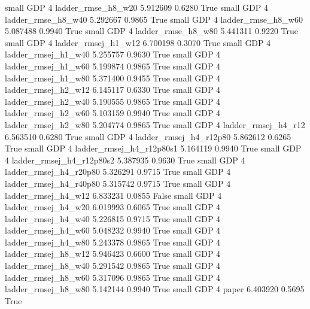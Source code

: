      small      GDP                 4       ladder_rmse_h8_w20   5.912609      0.6280    True
     small      GDP                 4       ladder_rmse_h8_w40   5.292667      0.9865    True
     small      GDP                 4       ladder_rmse_h8_w60   5.087488      0.9940    True
     small      GDP                 4       ladder_rmse_h8_w80   5.441311      0.9220    True
     small      GDP                 4      ladder_rmsej_h1_w12   6.700198      0.3070    True
     small      GDP                 4      ladder_rmsej_h1_w40   5.255757      0.9630    True
     small      GDP                 4      ladder_rmsej_h1_w60   5.199874      0.9865    True
     small      GDP                 4      ladder_rmsej_h1_w80   5.371400      0.9455    True
     small      GDP                 4      ladder_rmsej_h2_w12   6.145117      0.6330    True
     small      GDP                 4      ladder_rmsej_h2_w40   5.190555      0.9865    True
     small      GDP                 4      ladder_rmsej_h2_w60   5.103159      0.9940    True
     small      GDP                 4      ladder_rmsej_h2_w80   5.204774      0.9865    True
     small      GDP                 4      ladder_rmsej_h4_r12   6.563510      0.6280    True
     small      GDP                 4   ladder_rmsej_h4_r12p80   5.862612      0.6265    True
     small      GDP                 4 ladder_rmsej_h4_r12p80s1   5.164119      0.9940    True
     small      GDP                 4 ladder_rmsej_h4_r12p80s2   5.387935      0.9630    True
     small      GDP                 4   ladder_rmsej_h4_r20p80   5.326291      0.9715    True
     small      GDP                 4   ladder_rmsej_h4_r40p80   5.315742      0.9715    True
     small      GDP                 4      ladder_rmsej_h4_w12   6.833231      0.0855   False
     small      GDP                 4      ladder_rmsej_h4_w20   6.019993      0.6065    True
     small      GDP                 4      ladder_rmsej_h4_w40   5.226815      0.9715    True
     small      GDP                 4      ladder_rmsej_h4_w60   5.048232      0.9940    True
     small      GDP                 4      ladder_rmsej_h4_w80   5.243378      0.9865    True
     small      GDP                 4      ladder_rmsej_h8_w12   5.946423      0.6600    True
     small      GDP                 4      ladder_rmsej_h8_w40   5.291542      0.9865    True
     small      GDP                 4      ladder_rmsej_h8_w60   5.317096      0.9865    True
     small      GDP                 4      ladder_rmsej_h8_w80   5.142144      0.9940    True
     small      GDP                 4                    paper   6.403920      0.5695    True
